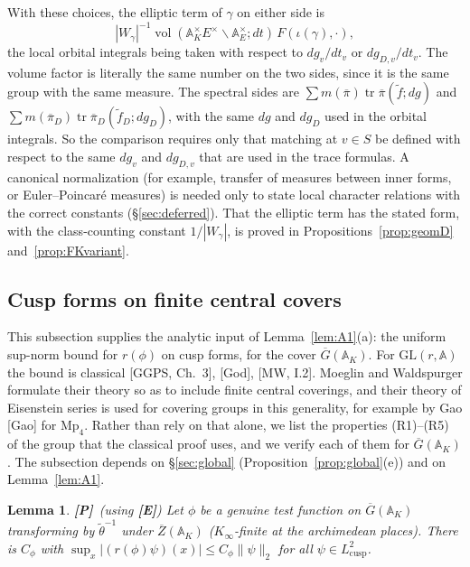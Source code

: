\documentclass[12pt]{article}
\newcommand{\ov}[1]{\overline{#1}}
\newcommand{\A}{\mathbb{A}}
\newcommand{\tr}{\operatorname{tr}}
\newcommand{\vol}{\operatorname{vol}}
\newcommand{\GL}{\mathrm{GL}}
\newcommand{\Gb}{\ov{G}}
\newcommand{\Zb}{\ov{Z}}
\newcommand{\pib}{\ov{\pi}}
\newcommand{\Pv}{\textbf{[P]}}
\newcommand{\Ev}{\textbf{[E]}}
\theoremstyle{plain}
\newtheorem{lemma}[theorem]{Lemma}
\theoremstyle{definition}
\begin{document}
With these choices, the elliptic term of $\gamma$ on either side is \[ |W_\gamma|^{-1}\vol(\A_K^\times E^\times\backslash\A_E^\times;dt)\,F(\iota(\gamma),\cdot), \] the local orbital integrals being taken with respect to $dg_v/dt_v$ or $dg_{D,v}/dt_v$. The volume factor is literally the same number on the two sides, since it is the same group with the same measure. The spectral sides are $\sum m(\pib)\tr\pib(\tilde f;dg)$ and $\sum m(\pib_D)\tr\pib_D(\tilde f_D;dg_D)$, with the same $dg$ and $dg_D$ used in the orbital integrals. So the comparison requires only that matching at $v\in S$ be defined with respect to the same $dg_v$ and $dg_{D,v}$ that are used in the trace formulas. A canonical normalization (for example, transfer of measures between inner forms, or Euler--Poincar\'e measures) is needed only to state local character relations with the correct constants (\S\ref{sec:deferred}). That the elliptic term has the stated form, with the class-counting constant $1/|W_\gamma|$, is proved in Propositions~\ref{prop:geomD} and~\ref{prop:FKvariant}.

\subsection{Cusp forms on finite central covers}\label{app:cusp}
This subsection supplies the analytic input of Lemma~\ref{lem:A1}(a): the uniform sup-norm bound for $r(\phi)$ on cusp forms, for the cover $\Gb(\A_K)$. For $\GL(r,\A)$ the bound is classical [GGPS, Ch.~3], [God], [MW, I.2]. Moeglin and Waldspurger formulate their theory so as to include finite central coverings, and their theory of Eisenstein series is used for covering groups in this generality, for example by Gao [Gao] for $\mathrm{Mp}_4$. Rather than rely on that alone, we list the properties (R1)--(R5) of the group that the classical proof uses, and we verify each of them for $\Gb(\A_K)$. The subsection depends on \S\ref{sec:global} (Proposition~\ref{prop:global}(e)) and on Lemma~\ref{lem:A1}.

\begin{lemma}\label{lem:Bsup}\Pv\ (using \Ev)
Let $\phi$ be a genuine test function on $\Gb(\A_K)$ transforming by $\tilde\theta^{-1}$ under $\Zb(\A_K)$ ($K_\infty$-finite at the archimedean places). There is $C_\phi$ with $\sup_x|(r(\phi)\psi)(x)|\le C_\phi\|\psi\|_2$ for all $\psi\in L^2_{\mathrm{cusp}}$.
\end{lemma}
\end{document}
